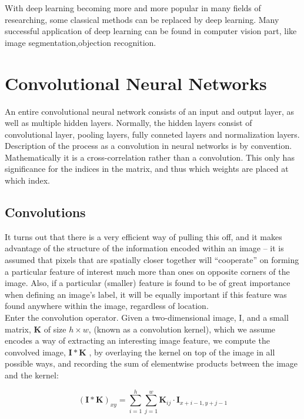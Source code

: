     With deep learning becoming more and more popular in many fields of researching, some classical methods can be replaced by deep learning. Many successful application of deep learning can be found in computer vision part, like image segmentation\cite{lecun2015deep},objection recognition\cite{he2016deep}.

\section{Convolutional Neural Networks}
    An entire convolutional neural network consists of an input and output layer, as well as multiple hidden layers. Normally, the hidden layers consist of convolutional layer, pooling layers, fully conneted layers and normalization layers. \\

    Description of the process as a convolution in neural networks is by convention. Mathematically it is a cross-correlation rather than a convolution. This only has significance for the indices in the matrix, and thus which weights are placed at which index. 

    \subsection{Convolutions}
    It turns out that there is a very efficient way of pulling this off, and it makes advantage of the structure of the information encoded within an image – it is assumed that pixels that are spatially closer together will ``cooperate'' on forming a particular feature of interest much more than ones on opposite corners of the image. Also, if a particular (smaller) feature is found to be of great importance when defining an image's label, it will be equally important if this feature was found anywhere within the image, regardless of location. \\

    Enter the convolution operator. Given a two-dimensional image, I, and a small matrix, $\pmb{K}$ of size $h \times w$, (known as a convolution kernel), which we assume encodes a way of extracting an interesting image feature, we compute the convolved image, $\pmb{I} * \pmb{K}$ , by overlaying the kernel on top of the image in all possible ways, and recording the sum of elementwise products between the image and the kernel:

    \begin{equation}
        (\pmb{I} * \pmb{K})_{xy} = \sum_{i=1}^{h}\sum_{j=1}^{w} \pmb{K}_{ij}\cdot \pmb{I}_{x+i-1, y+j-1}
    \end{equation}

